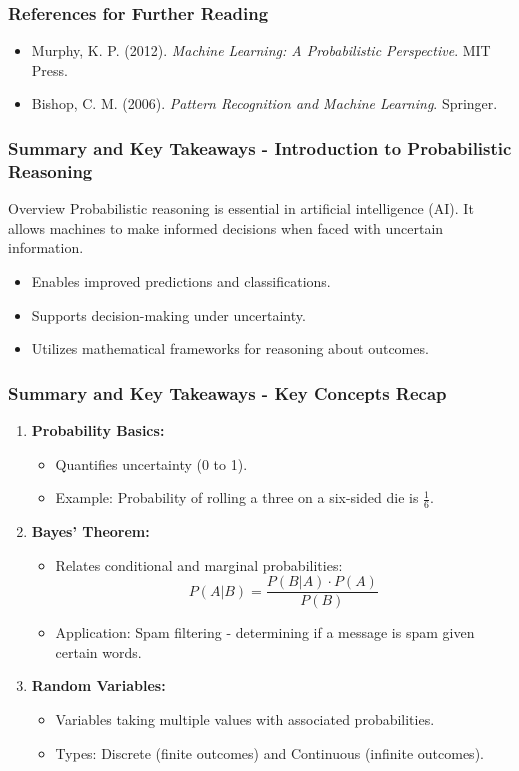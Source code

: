 \documentclass[aspectratio=169]{beamer}
\begin{document}
\begin{frame}[fragile]
    \frametitle{References for Further Reading}
    \begin{itemize}
        \item Murphy, K. P. (2012). \textit{Machine Learning: A Probabilistic Perspective}. MIT Press.
        \item Bishop, C. M. (2006). \textit{Pattern Recognition and Machine Learning}. Springer.
    \end{itemize}
\end{frame}

\begin{frame}[fragile]
    \frametitle{Summary and Key Takeaways - Introduction to Probabilistic Reasoning}
    \begin{block}{Overview}
        Probabilistic reasoning is essential in artificial intelligence (AI). It allows machines to make informed decisions when faced with uncertain information.
    \end{block}
    \begin{itemize}
        \item Enables improved predictions and classifications.
        \item Supports decision-making under uncertainty.
        \item Utilizes mathematical frameworks for reasoning about outcomes.
    \end{itemize}
\end{frame}

\begin{frame}[fragile]
    \frametitle{Summary and Key Takeaways - Key Concepts Recap}
    \begin{enumerate}
        \item \textbf{Probability Basics:}
            \begin{itemize}
                \item Quantifies uncertainty (0 to 1).
                \item Example: Probability of rolling a three on a six-sided die is \(\frac{1}{6}\).
            \end{itemize}
        \item \textbf{Bayes' Theorem:}
            \begin{itemize}
                \item Relates conditional and marginal probabilities:
                \[
                P(A|B) = \frac{P(B|A) \cdot P(A)}{P(B)}
                \]
                \item Application: Spam filtering - determining if a message is spam given certain words.
            \end{itemize}
        \item \textbf{Random Variables:}
            \begin{itemize}
                \item Variables taking multiple values with associated probabilities.
                \item Types: Discrete (finite outcomes) and Continuous (infinite outcomes).
            \end{itemize}
    \end{enumerate}
\end{frame}
\end{document}
